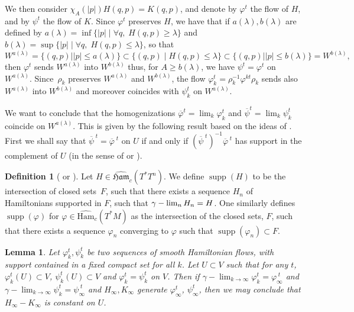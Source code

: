 \documentclass[JEP,XML,SOM,NoFloatCountersInSection,Unicode,published]{cedram}
\numberwithin{equation}{section}
\DeclareMathOperator{\supp}{supp}
\newcommand {\Ham}{{\mathfrak {Ham}}}
\newcommand {\DHam}{\mathrm{Ham}}
\newcommand{\gclHamc}[1]{\widehat{\Ham}_c(#1)}
\newcommand{\gclDHamc}[1]{\widehat{\DHam}_c(#1)}
\let \phi \varphi
\theoremstyle{plain}
\newtheorem{lemma}[theorem]{Lemma}
\theoremstyle{definition}
\newtheorem{definition}[theorem]{Definition}
\theoremstyle{remark}
\begin{document}
We then consider $\chi_{A}(\vert p \vert) H(q,p) = K(q,p)$, and denote by $\varphi^{t}$ the flow of $H$, and by $\psi^t$ the flow of $K$. Since $\varphi^{t}$ preserves $H$, we have that if
$a(\lambda), b(\lambda)$ are defined by $a(\lambda)= \inf \{ \vert p \vert \mid \forall q, \; H(q,p) \geq \lambda \}$ and $b(\lambda)= \sup \{ \vert p \vert \mid \forall q,\;H(q,p) \leq \lambda \}$, so that
\[
W^{a(\lambda)}=\{(q,p) \mid \vert p \vert \leq a(\lambda) \} \subset \{ (q,p) \mid H(q,p) \leq \lambda \} \subset \{ (q,p) \mid \vert p \vert \leq b(\lambda)\}=W^{b(\lambda)},
\]
then $\varphi^{t}$ sends $W^{a(\lambda)}$ into $W^{b(\lambda)}$ thus, for $A \geq b(\lambda)$, we have $\psi^{t}=\varphi^{t}$ on $W^{a(\lambda)}$. Since~$\rho_{k}$ preserves $ W^{a(\lambda)}$ and $W^{b(\lambda)}$, the flow $\varphi_{k}^t =\rho_{k}^{-1}\varphi^{kt} \rho_{k}$ sends also $W^{a(\lambda)}$ into $W^{b(\lambda)}$ and moreover coincides with $\psi_{k}^{t}$ on $W^{a(\lambda)}$.

We want to conclude that the homogenizations $\overline\phi^t= \lim_{k} \varphi_{k}^t$ and $\overline\psi^t= \lim_{k}\psi_{k}^t$ coincide on $W^{a(\lambda)}$. This is given by the following result based on the ideas of \cite[\S 4.4]{Humiliere}. First we shall say that ${\overline \psi}^{\; t}={\overline \varphi}^{\; t}$ on $U$ if and only if $ ({\overline \psi}^{\; t})^{-1}{\overline \varphi}^{\; t}$ has support in the complement of $U$ (in the sense of \cite[\S4.4]{Humiliere} or \cite[Def.\,2.24, p.\,51]{Humiliere2}).

\skpt
\begin{definition}[{\cite[\S4.4]{Humiliere} or \cite[Def.\,2.24, p.\,51]{Humiliere2}}]
Let $H \in \gclHamc{T^{*}T^{n}}$. We define
$\supp(H)$ to be the intersection of closed sets~$F$, such that there exists a sequence $H_{n}$ of Hamiltonians supported in $F$, such that $\gamma-\nobreak\lim_{n}H_{n}=H$.
One similarly defines $\supp (\varphi)$ for $\varphi \in \gclDHamc{T^{*}M}$ as the intersection of the closed sets, $F$, such that there exists a sequence $\varphi_{n}$ converging to $\varphi$ such that $\supp (\varphi_{n})\subset F$.
\end{definition}

\begin{lemma}\label{lemma-12.2} Let $\varphi_{k}^{t}, \psi_{k}^{t}$ be two sequences of smooth Hamiltonian flows, with support contained in a fixed compact set for all $k$.
Let $U\subset V$ such that for any $t$, $\varphi_{k}^{t}(U) \subset V$, $\psi_{k}^{t}(U) \subset V$ and $\varphi_{k}^{t}= \psi_{k}^{t}$ on $V$. Then if $\gamma-\lim_{k\to \infty }\varphi_{k}^t={ \varphi}_{\infty}^{\; t}$ and
$\gamma-\lim_{k\to \infty }\psi_{k}^t={\psi}_{\infty}^{\; t}$ and $H_{\infty}, K_{\infty}$ generate $\varphi_{\infty}^t$, $\psi_{\infty}^t$, then we may conclude that $H_{\infty}-K_{\infty}$ is constant on $U$.
\end{lemma}
\end{document}
